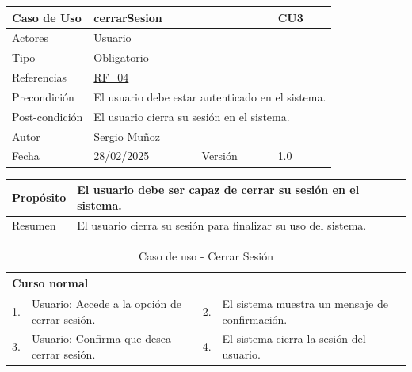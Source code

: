 \begin{table}[H]
    \centering
    \begin{tabular}{| m{} | m{} | m{} | m{} |}
        \hline
        \rowcolor[HTML]{C0C0C0} Caso de Uso & \multicolumn{2}{|m{0.43\textwidth}|}{cerrarSesion} &  CU3\\ 
        \hline
        Actores & \multicolumn{3}{l|}{Usuario} \\ 
        \hline
        Tipo & \multicolumn{3}{l|}{Obligatorio} \\ 
        \hline
        Referencias & \multicolumn{3}{l|}{\hyperref[req:RF04]{RF\_04}} \\ 
        \hline
        Precondición & \multicolumn{3}{l|}{El usuario debe estar autenticado en el sistema.} \\ 
        \hline
        Post-condición & \multicolumn{3}{l|}{El usuario cierra su sesión en el sistema.} \\ 
        \hline
        Autor & \multicolumn{3}{l|}{Sergio Muñoz} \\ 
        \hline
        Fecha & 28/02/2025 & Versión & 1.0 \\ 
        \hline
    \end{tabular}
\end{table}

\begin{table}[H]
    \centering
    \begin{tabular}{| m{} | m{} | m{} | m{} |}
        \hline
        Propósito & \multicolumn{3}{m{0.67\textwidth}|}{El usuario debe ser capaz de cerrar su sesión en el sistema.} \\ 
        \hline
        Resumen & \multicolumn{3}{m{0.67\textwidth}|}{El usuario cierra su sesión para finalizar su uso del sistema.} \\ 
        \hline
    \end{tabular}
\end{table}

\begin{table}[H]
    \centering
    \begin{tabular}{| m{} | m{} | m{} | m{} |}
        \hline
        \multicolumn{4}{|m{0.9\textwidth}|}{Curso normal} \\ 
        \hline
        1. & Usuario: Accede a la opción de cerrar sesión. 
        & 2. & El sistema muestra un mensaje de confirmación. \\ 
        \hline
        3. & Usuario: Confirma que desea cerrar sesión. 
        & 4. & El sistema cierra la sesión del usuario. \\ 
        \hline
    \end{tabular}
    \caption{Caso de uso - Cerrar Sesión}
\end{table}


